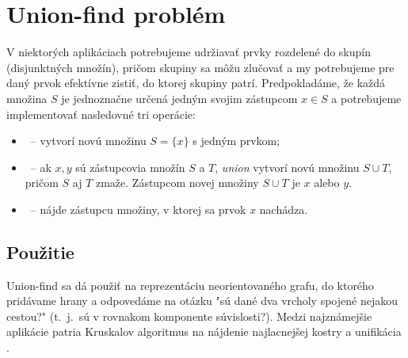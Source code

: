  
\chapter{Union-find problém}\label{chap:vizualizacia}

V niektorých aplikáciach potrebujeme udržiavať prvky rozdelené do skupín
(disjunktných množín), pričom skupiny sa môžu zlučovať a my potrebujeme
pre daný prvok efektívne zistiť, do ktorej skupiny patrí. Predpokladáme,
že každá množina $S$ je jednoznačne určená jedným svojim zástupcom $x\in S$
a potrebujeme implementovať nasledovné tri operácie:

\begin{itemize}
\item \makeset\ -- vytvorí novú množinu $S=\{x\}$ s jedným prvkom; %
\item \union\ -- ak $x,y$ sú zástupcovia množín $S$ a $T$,
                 {\it union} vytvorí novú množinu $S\cup T$,
                 pričom $S$ aj $T$ zmaže. Zástupcom novej množiny $S\cup T$
                 je $x$ alebo $y$.
\item \find\ -- nájde zástupcu množiny, v ktorej sa 
                prvok $x$ nachádza.
\end{itemize}



\section{Použitie}

Union-find sa dá použiť na reprezentáciu neorientovaného grafu,
do ktorého pridávame hrany a odpovedáme na otázku "sú dané dva
vrcholy spojené nejakou cestou?" (t.~j.\ sú v rovnakom komponente súvislosti?).
Medzi najznámejšie aplikácie patria Kruskalov algoritmus na nájdenie najlacnejšej
kostry \citep{kruskal} a unifikácia \citep{unif}.


